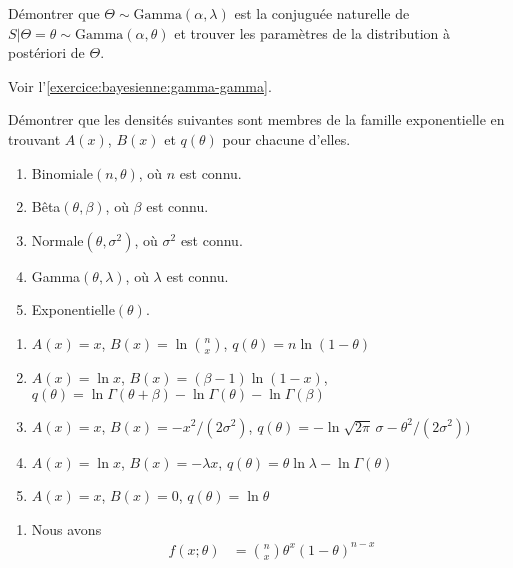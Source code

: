 \begin{exercice}
  Démontrer que $\Theta \sim \text{Gamma}(\alpha, \lambda)$ est la
  conjuguée naturelle de $S|\Theta = \theta \sim \text{Gamma}(\alpha,
  \theta)$ et trouver les paramètres de la distribution à postériori
  de $\Theta$.
  \begin{sol}
    Voir l'\autoref{exercice:bayesienne:gamma-gamma}.
  \end{sol}
\end{exercice}

\begin{exercice}
  Démontrer que les densités suivantes sont membres de la famille
  exponentielle en trouvant $A(x)$, $B(x)$ et $q(\theta)$ pour chacune
  d'elles.
  \begin{enumerate}
  \item Binomiale$(n, \theta)$, où $n$ est connu.
  \item Bêta$(\theta, \beta)$, où $\beta$ est connu.
  \item Normale$(\theta, \sigma^{2})$, où $\sigma^2$ est connu.
  \item Gamma$(\theta, \lambda)$, où $\lambda$ est connu.
  \item Exponentielle$(\theta)$.
  \end{enumerate}
  \begin{rep}
    \begin{enumerate}
    \item $A(x) = x$,
      $B(x) = \ln \binom{n}{x}$,
      $q(\theta)= n \ln (1 - \theta)$
    \item $A(x) = \ln x$,
      $B(x) = (\beta - 1)\ln(1 - x)$,
      $q(\theta) = \ln \Gamma(\theta + \beta) - \ln \Gamma(\theta) -
      \ln \Gamma(\beta)$
    \item $A(x) = x$,
      $B(x) = -x^2/(2\sigma^2)$,
      $q(\theta) = -\ln \sqrt{2\pi}\, \sigma - \theta^2/(2\sigma^2))$
    \item $A(x) = \ln x$,
      $B(x) = -\lambda x$,
      $q(\theta) = \theta \ln \lambda - \ln \Gamma(\theta)$
    \item $A(x) = x$,
      $B(x) = 0$,
      $q(\theta) = \ln \theta$
    \end{enumerate}
  \end{rep}
  \begin{sol}
    \begin{enumerate}
    \item Nous avons
      \begin{align*}
        f(x; \theta)
        &= \binom{n}{x} \theta^x (1-\theta)^{n-x} \\

\end{align*}
\end{enumerate}
\end{sol}
\end{exercice}
